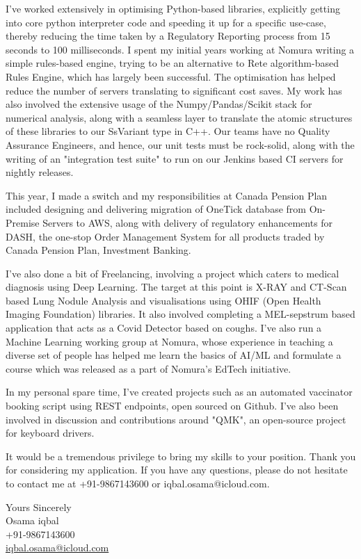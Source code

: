 \documentclass[11pt,a4paper]{article}
\begin{document}
I've worked extensively in optimising Python-based libraries, explicitly getting into core python interpreter code and speeding it up for a specific use-case, thereby reducing the time taken by a Regulatory Reporting process from 15 seconds to 100 milliseconds. I spent my initial years working at Nomura writing a simple rules-based engine, trying to be an alternative to Rete algorithm-based Rules Engine, which has largely been successful. The optimisation has helped reduce the number of servers translating to significant cost saves. My work has also involved the extensive usage of the Numpy/Pandas/Scikit stack for numerical analysis, along with a seamless layer to translate the atomic structures of these libraries to our SsVariant type in C++. Our teams have no Quality Assurance Engineers, and hence, our unit tests must be rock-solid, along with the writing of an "integration test suite" to run on our Jenkins based CI servers for nightly releases. \par

This year, I made a switch and my responsibilities at Canada Pension Plan included designing and delivering migration of OneTick database from On-Premise Servers to AWS, along with delivery of regulatory enhancements for DASH, the one-stop Order Management System for all products traded by Canada Pension Plan, Investment Banking. \par

I've also done a bit of Freelancing, involving a project which caters to medical diagnosis using Deep Learning. The target at this point is X-RAY and CT-Scan based Lung Nodule Analysis and visualisations using OHIF (Open Health Imaging Foundation) libraries. It also involved completing a MEL-sepstrum based application that acts as a Covid Detector based on coughs. I've also run a Machine Learning working group at Nomura, whose experience in teaching a diverse set of people has helped me learn the basics of AI/ML and formulate a course which was released as a part of Nomura's EdTech initiative. \par

In my personal spare time, I've created projects such as an automated vaccinator booking script using REST endpoints, open sourced on Github. I’ve also been involved in discussion and contributions around "QMK", an open-source project for keyboard drivers. \par

It would be a tremendous privilege to bring my skills to your position. Thank you for considering my application. If you have any questions, please do not hesitate to contact me at +91-9867143600 or iqbal.osama@icloud.com. \par


\vspace{0.5cm}
\raggedright
Yours Sincerely \\ Osama iqbal \\ +91-9867143600 \\ \href{mailto:iqbal.osama@icloud.com}{iqbal.osama@icloud.com}

\end{document}
